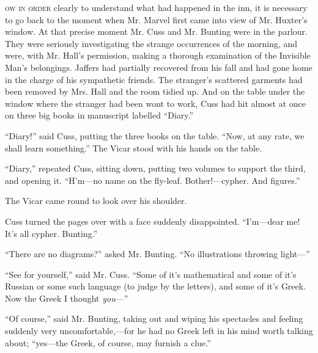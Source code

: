 \label{ch:11}
\begin{ChapterStart}
\vspace*{2\nbs}

\vspace{1.5\nbs}
\vspace{0.75\nbs}
\end{ChapterStart}

\kern-5pt\textsc{ow in order} clearly to understand what had happened in the inn, it is necessary to go back to the moment when Mr. Marvel first came into view of Mr. Huxter’s window. At that precise moment Mr. Cuss and Mr. Bunting were in the parlour. They were seriously investigating the strange occurrences of the morning, and were, with Mr. Hall’s permission, making a thorough examination of the Invisible Man’s belongings. Jaffers had partially recovered from his fall and had gone home in the charge of his sympathetic friends. The stranger’s scattered garments had been removed by Mrs. Hall and the room tidied up. And on the table under the window where the stranger had been wont to work, Cuss had hit almost at once on three big books in manuscript labelled “Diary.”

“Diary!” said Cuss, putting the three books on the table. “Now, at any rate, we shall learn something.” The Vicar stood with his hands on the table.

“Diary,” repeated Cuss, sitting down, putting two volumes to support the third, and opening it. “H’m—no name on the fly-leaf. Bother!—cypher. And figures.”

The Vicar came round to look over his shoulder.

Cuss turned the pages over with a face suddenly disappointed. “I’m—dear me! It’s all cypher. Bunting.”

“There are no diagrams?” asked Mr. Bunting. “No illustrations throwing light—”

“See for yourself,” said Mr. Cuss. “Some of it’s mathematical and some of it’s Russian or some such language (to judge by the letters), and some of it’s Greek. Now the Greek I thought \emph{you}—”

“Of course,” said Mr. Bunting, taking out and wiping his spectacles and feeling suddenly very uncomfortable,—for he had no Greek left in his mind worth talking about; “yes—the Greek, of course, may furnish a clue.”

